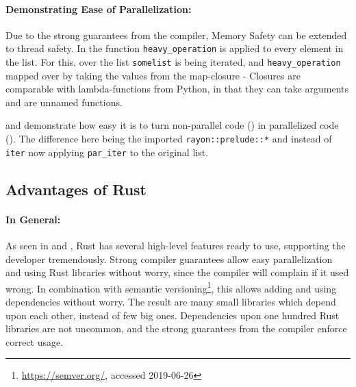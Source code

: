 

\paragraph{Demonstrating Ease of Parallelization:}\label{demo:par}

Due to the strong guarantees from the compiler, Memory Safety can be extended
to thread safety. In  the function \verb|heavy_operation| is
applied to every element in the list. For this, over the list \verb|somelist|
is being iterated, and \verb|heavy_operation| mapped over by taking the values
from the map-closure - Closures are comparable with lambda-functions from
Python, in that they can take arguments and are unnamed functions.

 and  demonstrate how easy it is to turn
non-parallel code () in parallelized code ().
The difference here being the imported \verb|rayon::prelude::*| and instead of
\verb|iter| now applying \verb|par_iter| to the original list.





\subsection{Advantages of Rust}\label{sec:RustAdvantages}


\paragraph{In General:} As seen in  and
, Rust has several high-level features ready to use,
supporting the developer tremendously. Strong compiler guarantees allow easy
parallelization and using Rust libraries without worry, since the compiler will
complain if it used wrong. In combination with semantic
versioning\footnote{\url{https://semver.org/}, accessed 2019-06-26}, this
allows adding and using dependencies without worry. The result are many small
libraries which depend upon each other, instead of few big ones. Dependencies
upon one hundred Rust libraries are not uncommon, and the strong guarantees
from the compiler enforce correct usage.

